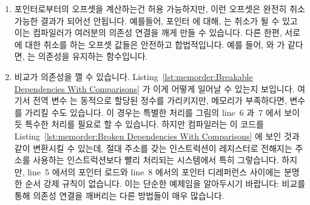 \begin{enumerate}
\item	포인터로부터의 오프셋을 계산하는건 허용 가능하지만, 이런 오프셋은
	완전히 취소 가능한 결과가 되어선 안됩니다.
	예를들어,  포인터  에 대해,  는
	취소가 될 수 있고 이는 컴파일러가 여러분의 의존성 연결을 깨게 만들 수
	있습니다.
	다른 한편, 서로에 대한 취소를 하는 오프셋 값들은 안전하고 합법적입니다.
	예를 들어,  와  가 같다면,  는 의존성을 유지하는
	함수입니다.

\item	비교가 의존성을 깰 수 있습니다.
	Listing~\ref{lst:memorder:Breakable Dependencies With Comparisons}
	가 이게 어떻게 일어날 수 있는지 보입니다.
	여기서 전역 변수  는 동적으로 할당된 정수를 가리키지만, 메모리가
	부족하다면,  변수를 가리킬 수도 있습니다.
	이  경우는 특별한 처리를 그림의 line~6 과~7 에서 보이듯
	특수한 처리를 필요로 할 수 있습니다.
	하지만 컴파일러는 이 코드를
	Listing~\ref{lst:memorder:Broken Dependencies With Comparisons}
	에 보인 것과 같이 변환시킬 수 있는데, 절대 주소를 갖는 인스트럭션이
	레지스터로 전해지는 주소를 사용하는 인스트럭션보다 빨리 처리되는
	시스템에서 특히 그렇습니다.
	하지만, line~5 에서의 포인터 로드와 line~8 에서의 포인터 디레퍼런스
	사이에는 분명한 순서 강제 규칙이 없습니다.
	이는 단순한 예제임을 알아두시기 바랍니다: 비교를 통해 의존성 연결을
	깨버리는 다른 방법들이 매우 많습니다.

\end{enumerate}

